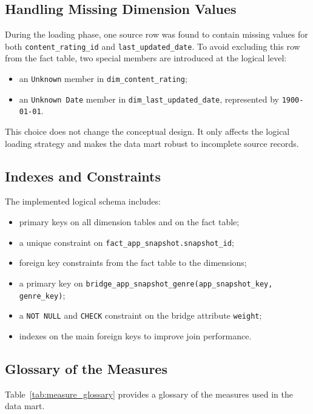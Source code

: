 \documentclass[11pt,a4paper]{article}
\begin{document}
\subsection{Handling Missing Dimension Values}
During the loading phase, one source row was found to contain missing values for both \texttt{content\_rating\_id} and \texttt{last\_updated\_date}. To avoid excluding this row from the fact table, two special members are introduced at the logical level:
\begin{itemize}[leftmargin=1.5em]
    \item an \texttt{Unknown} member in \texttt{dim\_content\_rating};
    \item an \texttt{Unknown Date} member in \texttt{dim\_last\_updated\_date}, represented by \texttt{1900-01-01}.
\end{itemize}

This choice does not change the conceptual design. It only affects the logical loading strategy and makes the data mart robust to incomplete source records.

\subsection{Indexes and Constraints}
The implemented logical schema includes:
\begin{itemize}[leftmargin=1.5em]
    \item primary keys on all dimension tables and on the fact table;
    \item a unique constraint on \texttt{fact\_app\_snapshot.snapshot\_id};
    \item foreign key constraints from the fact table to the dimensions;
    \item a primary key on \texttt{bridge\_app\_snapshot\_genre(app\_snapshot\_key, genre\_key)};
    \item a \texttt{NOT NULL} and \texttt{CHECK} constraint on the bridge attribute \texttt{weight};
    \item indexes on the main foreign keys to improve join performance.
\end{itemize}

\subsection{Glossary of the Measures}
Table~\ref{tab:measure_glossary} provides a glossary of the measures used in the data mart.
\end{document}
